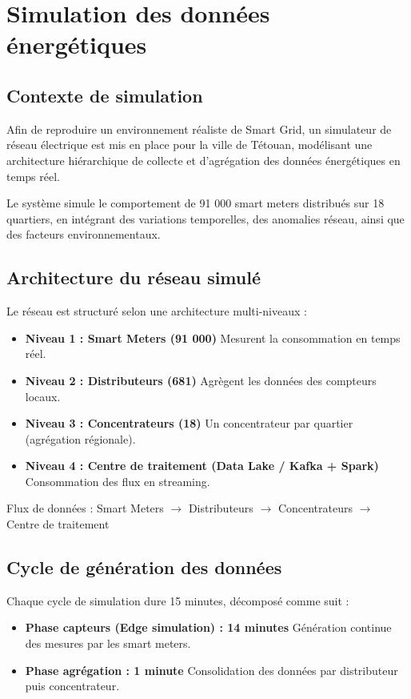 \documentclass[12pt,a4paper]{report}
\begin{document}
\section{Simulation des données énergétiques}

\subsection{Contexte de simulation}
Afin de reproduire un environnement réaliste de Smart Grid, un simulateur de réseau électrique est mis en place pour la ville de Tétouan, modélisant une architecture hiérarchique de collecte et d’agrégation des données énergétiques en temps réel.

Le système simule le comportement de 91 000 smart meters distribués sur 18 quartiers, en intégrant des variations temporelles, des anomalies réseau, ainsi que des facteurs environnementaux.

\subsection{Architecture du réseau simulé}
Le réseau est structuré selon une architecture multi-niveaux :

\begin{itemize}
\item \textbf{Niveau 1 : Smart Meters (91 000)}  
Mesurent la consommation en temps réel.

\item \textbf{Niveau 2 : Distributeurs (681)}  
Agrègent les données des compteurs locaux.

\item \textbf{Niveau 3 : Concentrateurs (18)}  
Un concentrateur par quartier (agrégation régionale).

\item \textbf{Niveau 4 : Centre de traitement (Data Lake / Kafka + Spark)}  
Consommation des flux en streaming.
\end{itemize}

Flux de données :  
Smart Meters $\rightarrow$ Distributeurs $\rightarrow$ Concentrateurs $\rightarrow$ Centre de traitement

\subsection{Cycle de génération des données}
Chaque cycle de simulation dure 15 minutes, décomposé comme suit :

\begin{itemize}
\item \textbf{Phase capteurs (Edge simulation) : 14 minutes}  
Génération continue des mesures par les smart meters.

\item \textbf{Phase agrégation : 1 minute}  
Consolidation des données par distributeur puis concentrateur.
\end{itemize}
\end{document}
